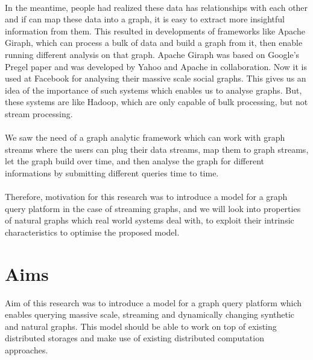 \documentclass[12pt]{report}
\numberwithin{figure}{section}
\numberwithin{table}{section}
\begin{document}
\paragraph{}

In the meantime, people had realized these data has relationships with each other and if can map these data into a graph, it is easy to extract more insightful information from them. This resulted in developments of frameworks like Apache Giraph, which can process a bulk of data and build a graph from it, then enable running different analysis on that graph. Apache Giraph was based on Google's Pregel\cite{Pregel} paper and was developed by Yahoo and Apache in collaboration. Now it is used at Facebook\cite{Facebook} for analysing their massive scale social graphs. This gives us an idea of the importance of such systems which enables us to analyse graphs.  But, these systems are like Hadoop, which are only capable of bulk processing, but not stream processing.

\paragraph{}

We saw the need of a graph analytic framework which can work with graph streams where the users can plug their data streams, map them to graph streams, let the graph build over time, and then analyse the graph for different informations by submitting different queries time to time.

\paragraph{}

Therefore, motivation for this research was to introduce a model for a graph query platform in the case of streaming graphs, and we will look into properties of natural graphs which real world systems deal with, to exploit their intrinsic characteristics to optimise the proposed model.

\section{Aims} 
Aim of this research was to introduce a model for a graph query platform which enables querying massive scale, streaming and dynamically changing synthetic  and natural graphs. This model should be able to work on top of existing distributed storages and make use of existing distributed computation approaches. 
\end{document}
